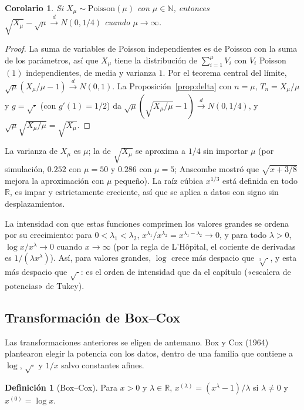 \documentclass[11pt,a4paper]{article}
\theoremstyle{plain}
\newtheorem{corolario}[teorema]{Corolario}
\theoremstyle{definition}
\newtheorem{definicion}[teorema]{Definición}
\theoremstyle{remark}
\newcommand{\R}{\mathbb{R}}
\newcommand{\N}{\mathbb{N}}
\newcommand{\1}{\mathbf{1}}
\begin{document}
\begin{corolario}\label{cor:poisson}
Si $X_\mu\sim\text{Poisson}(\mu)$ con $\mu\in\N$, entonces
$\sqrt{X_\mu}-\sqrt\mu\xrightarrow{d}N(0,1/4)$ cuando $\mu\to\infty$.
\end{corolario}

\begin{proof}
La suma de variables de Poisson independientes es de Poisson con la suma
de los parámetros, así que $X_\mu$ tiene la distribución de
$\sum_{i=1}^\mu V_i$ con $V_i$ Poisson$(1)$ independientes, de media y
varianza $1$. Por el teorema central del límite,
$\sqrt\mu(X_\mu/\mu-1)\xrightarrow{d}N(0,1)$. La
Proposición~\ref{prop:delta} con $n=\mu$, $T_n=X_\mu/\mu$ y $g=\sqrt{\cdot}$
(con $g'(1)=1/2$) da $\sqrt\mu(\sqrt{X_\mu/\mu}-1)\xrightarrow{d}N(0,1/4)$,
y $\sqrt\mu\sqrt{X_\mu/\mu}=\sqrt{X_\mu}$.
\end{proof}

La varianza de $X_\mu$ es $\mu$; la de $\sqrt{X_\mu}$ se aproxima a $1/4$
sin importar $\mu$ (por simulación, $0.252$ con $\mu=50$ y $0.286$ con
$\mu=5$; Anscombe mostró que $\sqrt{x+3/8}$ mejora la aproximación con
$\mu$ pequeño). La raíz cúbica $x^{1/3}$ está definida en todo $\R$, es
impar y estrictamente creciente, así que se aplica a datos con signo sin
desplazamientos.

La intensidad con que estas funciones comprimen los valores grandes se
ordena por su crecimiento: para $0<\lambda_1<\lambda_2$,
$x^{\lambda_1}/x^{\lambda_2}=x^{\lambda_1-\lambda_2}\to0$, y para todo
$\lambda>0$, $\log x/x^\lambda\to0$ cuando $x\to\infty$ (por la regla de
L'Hôpital, el cociente de derivadas es $1/(\lambda x^\lambda)$). Así, para
valores grandes, $\log$ crece más despacio que $\sqrt[3]{\cdot}$, y esta
más despacio que $\sqrt{\cdot}$: es el orden de intensidad que da el
capítulo («escalera de potencias» de Tukey).

\subsection{Transformación de Box--Cox}

Las transformaciones anteriores se eligen de antemano. Box y Cox (1964)
plantearon elegir la potencia con los datos, dentro de una familia que
contiene a $\log$, $\sqrt{\cdot}$ y $1/x$ salvo constantes afines.

\begin{definicion}[Box--Cox]
Para $x>0$ y $\lambda\in\R$,
$x^{(\lambda)}=(x^\lambda-1)/\lambda$ si $\lambda\ne0$ y
$x^{(0)}=\log x$.
\end{definicion}
\end{document}
